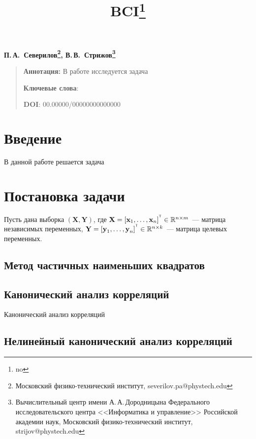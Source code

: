 \documentclass[12pt]{article}
\newcommand{\bY}{\mathbf{Y}}
\newcommand{\bX}{\mathbf{X}}
\newcommand{\T}{^{\text{\tiny\sffamily\upshape\mdseries T}}}
\begin{document}
	\title{BCI\thanks{no}}
	\date{}
	\author{}
	\maketitle
	
	\begin{center}
		\bf
		П.\,А.~Северилов\footnote{Московский физико-технический институт, severilov.pa@phystech.edu}, 
		В.\,В.~Стрижов\footnote{Вычислительный центр имени А.\,А.\,Дородницына Федерального исследовательского центра <<Информатика и управление>> Российской академии наук, Московский физико-технический институт, strijov@phystech.edu}
	\end{center}
	{\begin{quote}
			\textbf{Аннотация:}
			В работе исследуется задача 
			
			\smallskip
			\textbf{Ключевые слова}: 
			\smallskip
			
			\textbf{DOI}: 00.00000/00000000000000
		\end{quote}
	}

	
	\section{Введение}
	В данной работе решается задача 
	
	\section{Постановка задачи}
	
	Пусть дана выборка $(\bX, \bY)$, где $\textbf{X} = [\textbf{x}_1, \dots, \textbf{x}_{n}]^{\T} \in \mathbb{R}^{n \times m}$~--- матрица независимых переменных, $\textbf{Y} = [\textbf{y}_1, \dots, \textbf{y}_n]^{\T} \in \mathbb{R}^{n \times k}$~--- матрица целевых переменных.
	
	
	\subsection{Метод частичных наименьших квадратов}
	

	\subsection{Канонический анализ корреляций}
	
	Канонический анализ корреляций
	
	\subsection{Нелинейный канонический анализ корреляций}
	
\end{document}
